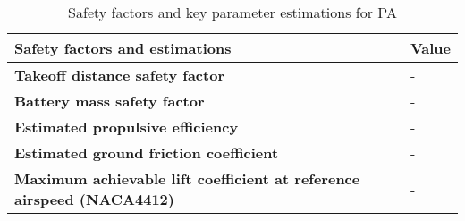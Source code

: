 \begin{table}[H]
\centering

    \begin{tabular}{@{}ll@{}}
    \toprule
    \textbf{Safety factors and estimations}                                       & \textbf{Value} \\ \midrule
    \textbf{Takeoff distance safety factor}                                       & -          \\
    \textbf{Battery mass safety factor}                                           & -         \\
    \textbf{Estimated propulsive efficiency}                                      & -          \\
    \textbf{Estimated ground friction coefficient}                                & -        \\
    \textbf{Maximum achievable lift coefficient at reference airspeed (NACA4412)} & -         \\ \bottomrule
    \end{tabular}
\caption{Safety factors and key parameter estimations for PA}
\label{tab: pa_safety}
\end{table}